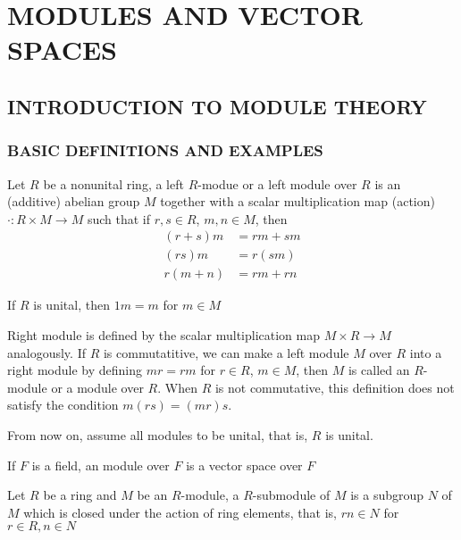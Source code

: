 \chapter{MODULES AND VECTOR SPACES}

\section{INTRODUCTION TO MODULE THEORY}

\subsection{BASIC DEFINITIONS AND EXAMPLES}

\begin{definition}
	Let $R$ be a nonunital ring, a left $R$-modue or a left module over $R$ is an (additive) abelian group $M$ together with a scalar multiplication map (action) $\cdot: R \times M \to M$ such that if $r, s \in R$, $m, n \in M$, then
	\begin{align*}
		(r + s)m &= rm + sm \\
		(rs) m &= r(sm) \\
		r (m + n) &= rm + rn
	\end{align*}
	
	If $R$ is unital, then $1m = m$ for $m \in M$
\end{definition}

\begin{remark}
	Right module is defined by the scalar multiplication map $M \times R \to M$ analogously. If $R$ is commutatitive, we can make a left module $M$ over $R$ into a right module by defining $mr = rm$ for $r \in R$, $m \in M$, then $M$ is called an $R$-module or a module over $R$. When $R$ is not commutative, this definition does not satisfy the condition $m (rs) = (m r) s$.
\end{remark}

\begin{remark}
	From now on, assume all modules to be unital, that is, $R$ is unital.
\end{remark}

\begin{remark}
	If $F$ is a field, an module over $F$ is a vector space over $F$
\end{remark}

\begin{definition}[submodule]
	Let $R$ be a ring and $M$ be an $R$-module, a $R$-submodule of $M$ is a subgroup $N$ of $M$ which is closed under the action of ring elements, that is, $rn \in N$ for $r \in R, n \in N$
\end{definition}

